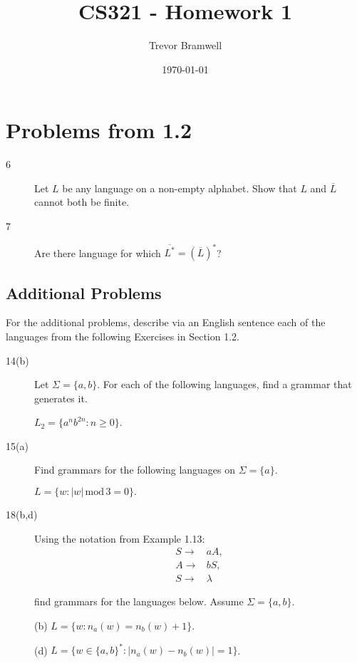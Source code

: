 \documentclass[12pt]{article}
\title{CS321 - Homework 1}
\author{Trevor Bramwell}
\date{\today}
\begin{document}
\maketitle

%
%
%
\section*{Problems from 1.2}
\begin{description}
    \item[6] Let $L$ be any language on a non-empty alphabet. Show that $L$ and
          $\overline{L}$ cannot both be finite.

    \item[7] Are there language for which $\overline{L^*} = (\overline{L})^*$?
\end{description}

\subsection*{Additional Problems}
For the additional problems, describe via an English sentence each of
the languages from the following Exercises in Section 1.2.

\begin{description}
    \item[14(b)] Let $\Sigma = \{a,b\}$. For each of the following
                 languages, find a grammar that generates it.

                 $L_2 = \{a^n b^{2n} : n \ge 0\}$.
\end{description}

\begin{description}
    \item[15(a)] Find grammars for the following languages on $\Sigma = \{a\}$.

                 $L = \{w : |w|\, \mathrm{mod}\, 3 = 0\}.$
\end{description}

\begin{description}
    \item[18(b,d)]
        Using the notation from Example 1.13:
        \begin{eqnarray*}
          S \to& aA, \\
          A \to& bS,\\
          S \to& \lambda
        \end{eqnarray*}

        find grammars for the languages below. Assume $\Sigma = \{a,b\}$.

        (b) $L = \{w : n_a (w) = n_b (w) + 1\}$.

        (d) $L = \{w \in \{a, b\}^* : |n_a(w) - n_b(w)| = 1\}$.
\end{description}
\end{document}
